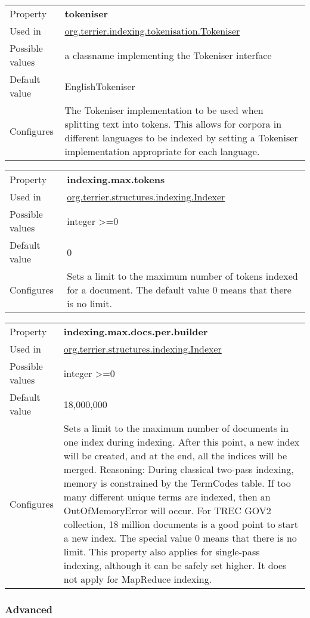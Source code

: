\begin{longtable}[]{@{}ll@{}}
\toprule
Property & \textbf{tokeniser}\tabularnewline
Used in &
\href{javadoc/org/terrier/indexing/tokenisation/Tokeniser.html}{org.terrier.indexing.tokenisation.Tokeniser}\tabularnewline
Possible values & a classname implementing the Tokeniser
interface\tabularnewline
Default value & EnglishTokeniser\tabularnewline
Configures & The Tokeniser implementation to be used when splitting text
into tokens. This allows for corpora in different languages to be
indexed by setting a Tokeniser implementation appropriate for each
language.\tabularnewline
\bottomrule
\end{longtable}

\begin{longtable}[]{@{}ll@{}}
\toprule
Property & \textbf{indexing.max.tokens}\tabularnewline
Used in &
\href{javadoc/org/terrier/structures/indexing/Indexer.html}{org.terrier.structures.indexing.Indexer}\tabularnewline
Possible values & integer \textgreater{}=0\tabularnewline
Default value & 0\tabularnewline
Configures & Sets a limit to the maximum number of tokens indexed for a
document. The default value 0 means that there is no
limit.\tabularnewline
\bottomrule
\end{longtable}

\begin{longtable}[]{@{}ll@{}}
\toprule
Property & \textbf{indexing.max.docs.per.builder}\tabularnewline
Used in &
\href{javadoc/org/terrier/structures/indexing/Indexer.html}{org.terrier.structures.indexing.Indexer}\tabularnewline
Possible values & integer \textgreater{}=0\tabularnewline
Default value & 18,000,000\tabularnewline
Configures & Sets a limit to the maximum number of documents in one
index during indexing. After this point, a new index will be created,
and at the end, all the indices will be merged. Reasoning: During
classical two-pass indexing, memory is constrained by the TermCodes
table. If too many different unique terms are indexed, then an
OutOfMemoryError will occur. For TREC GOV2 collection, 18 million
documents is a good point to start a new index. The special value 0
means that there is no limit. This property also applies for single-pass
indexing, although it can be safely set higher. It does not apply for
MapReduce indexing.\tabularnewline
\bottomrule
\end{longtable}

\subsubsection{Advanced}\label{advanced}

